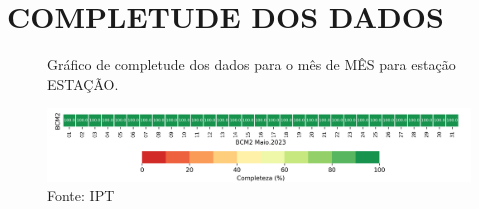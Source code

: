\section{COMPLETUDE DOS DADOS}

\begin{figure}[htb!]
    \centering
	\captionsetup{justification=raggedright, singlelinecheck=false, width=1\textwidth}
    \caption{Gráfico de completude dos dados para o mês de MÊS para estação ESTAÇÃO.}
    \includegraphics[width=1.0\textwidth]{./figuras/completude.png} %
    \caption*{Fonte: IPT}
    \label{fig:completude}
\end{figure}

